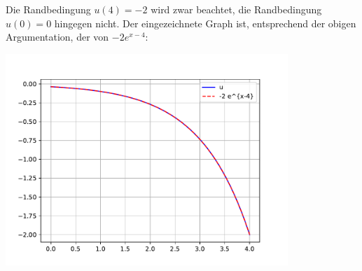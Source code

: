 Die Randbedingung $u(4) = -2$ wird zwar beachtet, die Randbedingung $u(0) = 0$ hingegen nicht.
Der eingezeichnete Graph ist, entsprechend der obigen Argumentation, der von $-2 e^{x-4}$:

\begin{center}
  \includegraphics[width = 0.8\textwidth]{chapter_04/exercise_04_22_figure_2.pdf}
\end{center}






